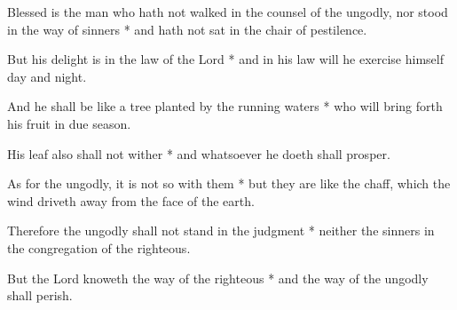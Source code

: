 Blessed is the man who hath not walked in the counsel of the ungodly, nor stood in the way of sinners * and hath not sat in the chair of pestilence.

But his delight is in the law of the Lord * and in his law will he exercise himself day and night.

And he shall be like a tree planted by the running waters * who will bring forth his fruit in due season.

His leaf also shall not wither * and whatsoever he doeth shall prosper.

As for the ungodly, it is not so with them * but they are like the chaff, which the wind driveth away from the face of the earth.

Therefore the ungodly shall not stand in the judgment * neither the sinners in the congregation of the righteous.

But the Lord knoweth the way of the righteous * and the way of the ungodly shall perish.